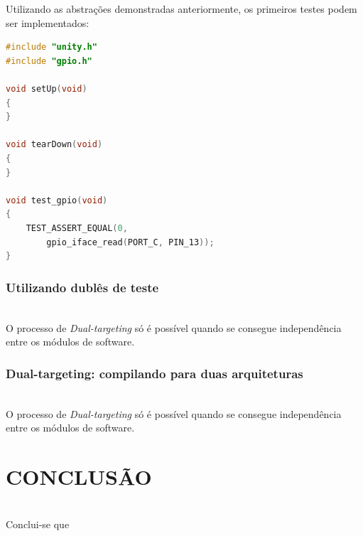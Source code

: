 \documentclass[times, twoside, watermark]{artigo}
\begin{document}
Utilizando as abstrações demonstradas anteriormente, os primeiros testes podem ser 
implementados:

\begin{lstlisting}[language=C, caption=Arquivo de testes]
#include "unity.h"
#include "gpio.h"

void setUp(void)
{
}

void tearDown(void)
{
}

void test_gpio(void)
{
    TEST_ASSERT_EQUAL(0, 
        gpio_iface_read(PORT_C, PIN_13));
}
\end{lstlisting}

\subsubsection{Utilizando dublês de teste}\hfill\\

O processo de \textit{Dual-targeting} só é possível quando se consegue independência
entre os módulos de software.


\subsubsection{Dual-targeting: compilando para duas arquiteturas}\hfill\\

O processo de \textit{Dual-targeting} só é possível quando se consegue independência
entre os módulos de software.





\section{CONCLUSÃO}\hfill\\
Conclui-se que 



\end{document}
